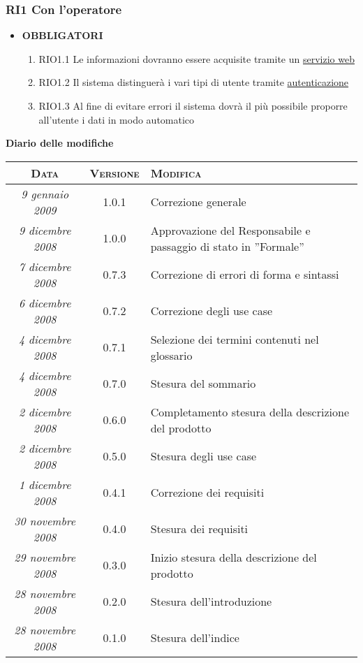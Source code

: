\documentclass[11pt,a4paper]{article}
\newcommand{\modifiche} 
{
\newpage
\begin{center}
\textbf{Diario delle modifiche} \\
\bigskip
\begin{tabular}{|c|c|p{0.51\textwidth}|}
\hline
\textsc{Data} & \textsc{Versione} & \textsc{Modifica} \\
\hline
\hline
\textit{9 gennaio 2009} & 1.0.1 & Correzione generale \\
\hline
\textit{9 dicembre 2008} & 1.0.0 & Approvazione del Responsabile e passaggio di stato in ''Formale''\\
\hline
\textit{7 dicembre 2008} & 0.7.3 & Correzione di errori di forma e sintassi\\
\hline
\textit{6 dicembre 2008} & 0.7.2 & Correzione degli use case \\
\hline
\textit{4 dicembre 2008} & 0.7.1 & Selezione dei termini contenuti nel glossario \\
\hline
\textit{4 dicembre 2008} & 0.7.0 & Stesura del sommario \\
\hline
\textit{2 dicembre 2008} & 0.6.0 & Completamento stesura della descrizione del prodotto \\
\hline
\textit{2 dicembre 2008} & 0.5.0 & Stesura degli use case \\
\hline
\textit{1 dicembre 2008} & 0.4.1 & Correzione dei requisiti \\
\hline
\textit{30 novembre 2008} & 0.4.0 & Stesura dei requisiti \\
\hline
\textit{29 novembre 2008} & 0.3.0 & Inizio stesura della descrizione del prodotto \\
\hline
\textit{28 novembre 2008} & 0.2.0 & Stesura dell'introduzione \\
\hline
\textit{28 novembre 2008} & 0.1.0 & Stesura dell'indice \\
\hline
\end{tabular}
\end{center}
}
\begin{document}
\subsubsection{RI1 Con l’operatore}
\begin{itemize}
\item \textbf{OBBLIGATORI}
\begin{enumerate}
\item RIO1.1 Le informazioni dovranno essere acquisite tramite un \underline{servizio web}
\item RIO1.2 Il sistema distinguerà i vari tipi di utente tramite \underline{autenticazione}
\item RIO1.3 Al fine di evitare errori il sistema dovrà il più possibile proporre all'utente i dati in modo automatico
\end{enumerate}
\end{itemize}
\modifiche
\end{document}
